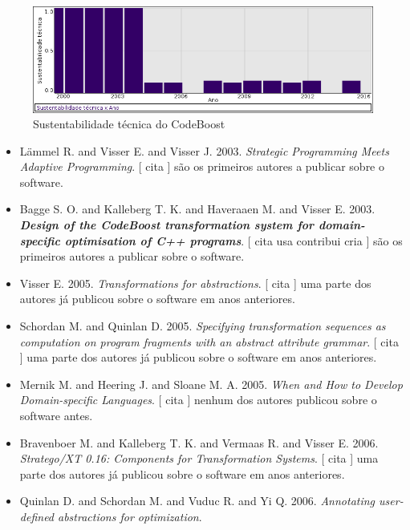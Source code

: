 \begin{figure}[h]
  \center
  \includegraphics[scale=0.50]{imagens/softwares-charts/codeboost.png}
  \caption{Sustentabilidade técnica do CodeBoost}
\end{figure}


\begin{itemize}
\item L\"{a}mmel R. and Visser E. and Visser J.
      2003.
        \textit{ Strategic Programming Meets Adaptive Programming}.
      [
          cita
      ]
são os primeiros autores a publicar sobre o software.
\item Bagge S. O. and Kalleberg T. K. and Haveraaen M. and Visser E.
      2003.
        \textbf{\textit{ Design of the CodeBoost transformation system for domain-specific optimisation of C++ programs}}.
      [
          cita
          usa
          contribui
          cria
      ]
são os primeiros autores a publicar sobre o software.
\item Visser E.
      2005.
        \textit{ Transformations for abstractions}.
      [
          cita
      ]
uma parte dos autores já publicou sobre o software em anos anteriores.
\item Schordan M. and Quinlan D.
      2005.
        \textit{ Specifying transformation sequences as computation on program fragments with an abstract attribute grammar}.
      [
          cita
      ]
uma parte dos autores já publicou sobre o software em anos anteriores.
\item Mernik M. and Heering J. and Sloane M. A.
      2005.
        \textit{ When and How to Develop Domain-specific Languages}.
      [
          cita
      ]
nenhum dos autores publicou sobre o software antes.
\item Bravenboer M. and Kalleberg T. K. and Vermaas R. and Visser E.
      2006.
        \textit{ Stratego/XT 0.16: Components for Transformation Systems}.
      [
          cita
      ]
uma parte dos autores já publicou sobre o software em anos anteriores.
\item Quinlan D. and Schordan M. and Vuduc R. and Yi Q.
      2006.
        \textit{ Annotating user-defined abstractions for optimization}.

\end{itemize}
